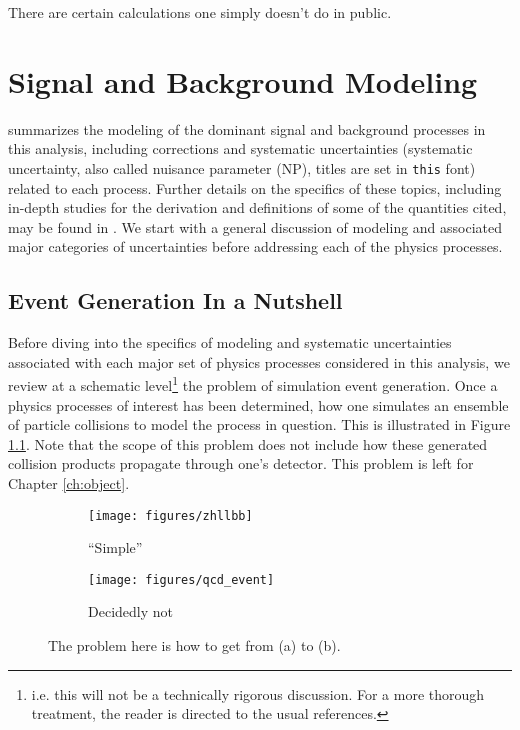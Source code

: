 \begin{savequote}[75mm]
There are certain calculations one simply doesn't do in public.
\end{savequote}

\chapter{Signal and Background Modeling}
\label{ch:modeling}
 summarizes the modeling of the dominant signal and background processes in this analysis, including corrections and systematic uncertainties (systematic uncertainty, also called nuisance parameter (NP), titles are set  in \texttt{this} font) related to each process.  Further details on the specifics of these topics, including in-depth studies for the derivation and definitions of some of the quantities cited, may be found in  \cite{modelingnote}.  We start with a general discussion of modeling and associated major categories of uncertainties before addressing each of the physics processes.    %


\section{Event Generation In a Nutshell}
Before diving into the specifics of modeling and systematic uncertainties associated with each major set of physics processes considered in this analysis, we review at a schematic level\footnote{i.e. this will not be a technically rigorous discussion.  For a more thorough treatment, the reader is directed to the usual references.} the problem of simulation event generation.  Once a physics processes of interest has been determined, how one simulates an ensemble of particle collisions to model the process in question.  This is illustrated in Figure \ref{fig:evgen}.  Note that the scope of this problem does not include how these generated collision products propagate through one's detector.  This problem is left for Chapter \ref{ch:object}.  

\begin{figure}[!htbp]\captionsetup{justification=centering}
  \centering
  \begin{subfigure}[t]{0.420000\textwidth}\centering\texttt{[image: figures/zhllbb]}\caption{``Simple''}\end{subfigure}
  \begin{subfigure}[t]{0.420000\textwidth}\centering\texttt{[image: figures/qcd\_event]}\caption{Decidedly not}\end{subfigure}
  \caption{The problem here is how to get from (a) to (b).}
  \label{fig:evgen}
\end{figure}

